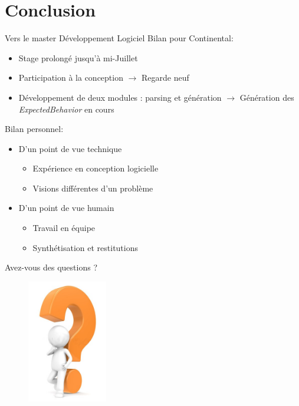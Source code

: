 \documentclass{beamer}
\begin{document}
\section*{Conclusion}
\begin{frame}{Vers le master Développement Logiciel}
		Bilan pour Continental:
	\vspace{-10px}
		\begin{itemize}
			\item Stage prolongé jusqu'à mi-Juillet
			\item Participation à la conception $\rightarrow$ Regarde neuf
			\item Développement de deux modules : parsing et génération\newline
				$\rightarrow$ Génération des \textit{ExpectedBehavior} en cours
		\end{itemize}
	\vfill
	\pause

	Bilan personnel:
	\vspace{-10px}
		\begin{itemize}
			\item D'un point de vue technique
				\begin{itemize}
					\item Expérience en conception logicielle
					\item Visions différentes d'un problème
				\end{itemize}
				\pause
			\item D'un point de vue humain
				\begin{itemize}
					\item Travail en équipe
					\item Synthétisation et restitutions
				\end{itemize}
		\end{itemize}
\end{frame}
\begin{frame}{Avez-vous des questions ?}
	\begin{figure}[H]
		\centering
		\includegraphics[width=3.5cm]{interrogation.jpg}
	\end{figure}
\end{frame}
\end{document}
